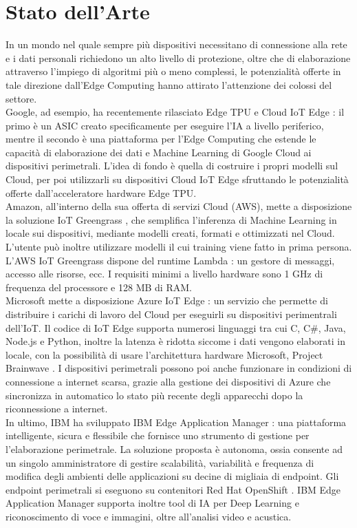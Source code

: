 \chapter{Stato dell'Arte}
In un mondo nel quale sempre più dispositivi necessitano di connessione alla rete e i dati personali richiedono un alto livello di protezione, oltre che di elaborazione attraverso l'impiego di algoritmi più o meno complessi, le potenzialità offerte in tale direzione dall'Edge Computing hanno attirato l'attenzione dei colossi del settore.\\ Google, ad esempio, ha recentemente rilasciato Edge TPU e Cloud IoT Edge \cite{iotgoogle}: il primo è un ASIC creato specificamente per eseguire l'IA a livello periferico, mentre il secondo è una piattaforma per l'Edge Computing che estende le capacità di elaborazione dei dati e Machine Learning di Google Cloud ai dispositivi perimetrali. L'idea di fondo è quella di costruire i propri modelli sul Cloud, per poi utilizzarli su dispositivi Cloud IoT Edge sfruttando le potenzialità offerte dall'acceleratore hardware Edge TPU. \\
Amazon, all'interno della sua offerta di servizi Cloud (AWS), mette a disposizione la soluzione IoT Greengrass \cite{aws}, che semplifica l'inferenza di Machine Learning in locale sui dispositivi, mediante modelli creati, formati e ottimizzati nel Cloud. L'utente può inoltre utilizzare modelli il cui training viene fatto in prima persona. L'AWS IoT Greengrass dispone del runtime Lambda \cite{lambda}: un gestore di messaggi, accesso alle risorse, ecc. I requisiti minimi a livello hardware sono 1 GHz di frequenza del processore e 128 MB di RAM.\\
Microsoft mette a disposizione Azure IoT Edge \cite{azure}: un servizio che permette di distribuire i carichi di lavoro del Cloud per eseguirli su dispositivi perimentrali dell'IoT. Il codice di IoT Edge supporta numerosi linguaggi tra cui C, C\#, Java, Node.js e Python, inoltre la latenza è ridotta siccome i dati vengono elaborati in locale, con la possibilità di usare l'architettura hardware Microsoft, Project Brainwave \cite{bwave}. I dispositivi perimetrali possono poi anche funzionare in condizioni di connessione a internet scarsa, grazie alla gestione dei dispositivi di Azure che sincronizza in automatico lo stato più recente degli apparecchi dopo la riconnessione a internet.\\
In ultimo, IBM ha sviluppato IBM Edge Application Manager \cite{IBM}: una piattaforma intelligente, sicura e flessibile che fornisce uno strumento di gestione per l'elaborazione perimetrale. La soluzione proposta è autonoma, ossia consente ad un singolo amministratore di gestire scalabilità, variabilità e frequenza di modifica degli ambienti delle applicazioni su decine di migliaia di endpoint. Gli endpoint perimetrali si eseguono su contenitori Red Hat OpenShift \cite{redhat}. IBM Edge Application Manager supporta inoltre tool di IA per Deep Learning e riconoscimento di voce e immagini, oltre all'analisi video e acustica.